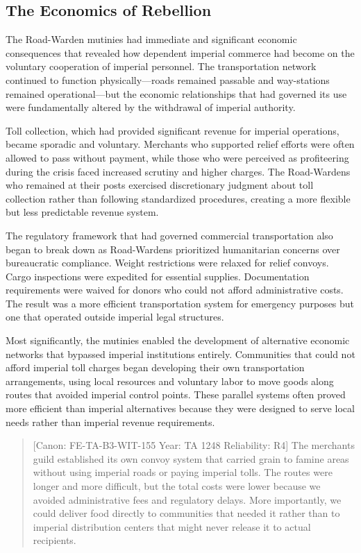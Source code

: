 \subsection{The Economics of
Rebellion}\label{the-economics-of-rebellion}

The Road-Warden mutinies had immediate and significant economic
consequences that revealed how dependent imperial commerce had become on
the voluntary cooperation of imperial personnel. The transportation
network continued to function physically---roads remained passable and
way-stations remained operational---but the economic relationships that
had governed its use were fundamentally altered by the withdrawal of
imperial authority.

Toll collection, which had provided significant revenue for imperial
operations, became sporadic and voluntary. Merchants who supported
relief efforts were often allowed to pass without payment, while those
who were perceived as profiteering during the crisis faced increased
scrutiny and higher charges. The Road-Wardens who remained at their
posts exercised discretionary judgment about toll collection rather than
following standardized procedures, creating a more flexible but less
predictable revenue system.

The regulatory framework that had governed commercial transportation
also began to break down as Road-Wardens prioritized humanitarian
concerns over bureaucratic compliance. Weight restrictions were relaxed
for relief convoys. Cargo inspections were expedited for essential
supplies. Documentation requirements were waived for donors who could
not afford administrative costs. The result was a more efficient
transportation system for emergency purposes but one that operated
outside imperial legal structures.

Most significantly, the mutinies enabled the development of alternative
economic networks that bypassed imperial institutions entirely.
Communities that could not afford imperial toll charges began developing
their own transportation arrangements, using local resources and
voluntary labor to move goods along routes that avoided imperial control
points. These parallel systems often proved more efficient than imperial
alternatives because they were designed to serve local needs rather than
imperial revenue requirements.

\begin{quote}
{[}Canon: FE-TA-B3-WIT-155 \textbar{} Year: TA 1248 \textbar{}
Reliability: R4{]} The merchants\textquotesingle{} guild established its
own convoy system that carried grain to famine areas without using
imperial roads or paying imperial tolls. The routes were longer and more
difficult, but the total costs were lower because we avoided
administrative fees and regulatory delays. More importantly, we could
deliver food directly to communities that needed it rather than to
imperial distribution centers that might never release it to actual
recipients.
\end{quote}

